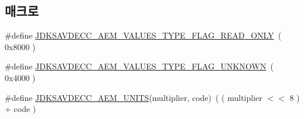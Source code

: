 \subsection*{매크로}
\begin{DoxyCompactItemize}
\item 
\#define \hyperlink{group__aem__descriptor_gaf97625660629df99e14716e3ac92435d}{J\+D\+K\+S\+A\+V\+D\+E\+C\+C\+\_\+\+A\+E\+M\+\_\+\+V\+A\+L\+U\+E\+S\+\_\+\+T\+Y\+P\+E\+\_\+\+F\+L\+A\+G\+\_\+\+R\+E\+A\+D\+\_\+\+O\+N\+LY}~( 0x8000 )
\item 
\#define \hyperlink{group__aem__descriptor_gabcd2556bd7945b124ab4f3e7e4d31c1b}{J\+D\+K\+S\+A\+V\+D\+E\+C\+C\+\_\+\+A\+E\+M\+\_\+\+V\+A\+L\+U\+E\+S\+\_\+\+T\+Y\+P\+E\+\_\+\+F\+L\+A\+G\+\_\+\+U\+N\+K\+N\+O\+WN}~( 0x4000 )
\item 
\#define \hyperlink{group__aem__descriptor_gae5f7498f6048b4dda1aca923b0eae0f6}{J\+D\+K\+S\+A\+V\+D\+E\+C\+C\+\_\+\+A\+E\+M\+\_\+\+U\+N\+I\+TS}(multiplier,  code)~( ( multiplier $<$$<$ 8 ) + code )
\end{DoxyCompactItemize}
